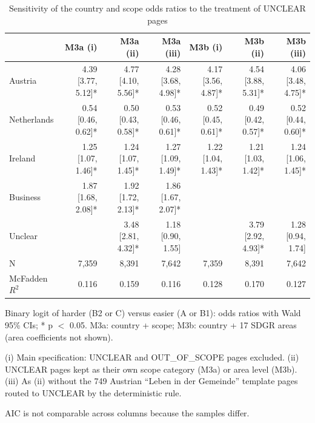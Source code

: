 \begin{table}[htbp]
\centering
\scriptsize\setlength{\tabcolsep}{3pt}
\begin{threeparttable}
\caption{Sensitivity of the country and scope odds ratios to the treatment of UNCLEAR pages}
\label{tab:regression-sensitivity}
\begin{tabular}{lrrrrrr}
\hline
 & M3a (i) & M3a (ii) & M3a (iii) & M3b (i) & M3b (ii) & M3b (iii) \\
\hline
Austria & 4.39 [3.77, 5.12]* & 4.77 [4.10, 5.56]* & 4.28 [3.68, 4.98]* & 4.17 [3.56, 4.87]* & 4.54 [3.88, 5.31]* & 4.06 [3.48, 4.75]* \\
Netherlands & 0.54 [0.46, 0.62]* & 0.50 [0.43, 0.58]* & 0.53 [0.46, 0.61]* & 0.52 [0.45, 0.61]* & 0.49 [0.42, 0.57]* & 0.52 [0.44, 0.60]* \\
Ireland & 1.25 [1.07, 1.46]* & 1.24 [1.07, 1.45]* & 1.27 [1.09, 1.49]* & 1.22 [1.04, 1.43]* & 1.21 [1.03, 1.42]* & 1.24 [1.06, 1.45]* \\
Business & 1.87 [1.68, 2.08]* & 1.92 [1.72, 2.13]* & 1.86 [1.67, 2.07]* &  &  &  \\
Unclear &  & 3.48 [2.81, 4.32]* & 1.18 [0.90, 1.55] &  & 3.79 [2.92, 4.93]* & 1.28 [0.94, 1.74] \\
\hline
N & 7,359 & 8,391 & 7,642 & 7,359 & 8,391 & 7,642 \\
McFadden $R^2$ & 0.116 & 0.159 & 0.116 & 0.128 & 0.170 & 0.127 \\
\hline
\end{tabular}
\begin{tablenotes}
\footnotesize
\item Binary logit of harder (B2 or C) versus easier (A or B1): odds ratios with Wald 95\% CIs; * p $<$ 0.05. M3a: country + scope; M3b: country + 17 SDGR areas (area coefficients not shown).
\item (i) Main specification: UNCLEAR and OUT\_OF\_SCOPE pages excluded. (ii) UNCLEAR pages kept as their own scope category (M3a) or area level (M3b). (iii) As (ii) without the 749 Austrian ``Leben in der Gemeinde'' template pages routed to UNCLEAR by the deterministic rule.
\item AIC is not comparable across columns because the samples differ.
\end{tablenotes}
\end{threeparttable}
\end{table}
